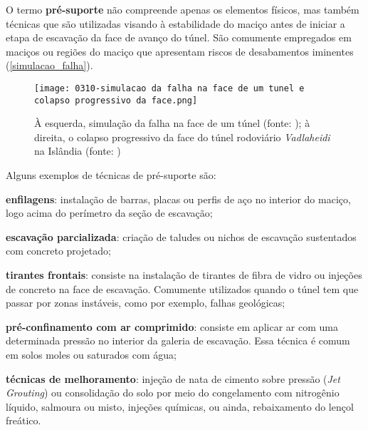 O termo \textbf{pré-suporte} não compreende apenas os elementos físicos, mas também técnicas que são utilizadas visando à estabilidade do maciço antes de iniciar a etapa de escavação da face de avanço do túnel. São comumente empregados em maciços ou regiões do maciço que apresentam riscos de desabamentos iminentes (\autoref{simulacao_falha}).

\begin{figure}[H]
	\begin{center}
		\texttt{[image: 0310-simulacao da falha na face de um tunel e colapso progressivo da face.png]}
	\end{center}
	\caption{\label{simulacao_falha}À esquerda, simulação da falha na face de um túnel (fonte: ); à direita, o colapso progressivo da face do túnel rodoviário \textit{Vadlaheidi} na Islândia (fonte: )}
\end{figure}

Alguns exemplos de técnicas de pré-suporte são:

\begin{alineas}
	
	\item \textbf{enfilagens}: instalação de barras, placas ou perfis de aço no interior do maciço, logo acima do perímetro da seção de escavação;
	
	\item \textbf{escavação parcializada}: criação de taludes ou nichos de escavação sustentados com concreto projetado;
	
	\item \textbf{tirantes frontais}: consiste na instalação de tirantes de fibra de vidro ou injeções de concreto na face de escavação. Comumente utilizados quando o túnel tem que passar por zonas instáveis, como por exemplo, falhas geológicas;
	
	\item \textbf{pré-confinamento com ar comprimido}: consiste em aplicar ar com uma determinada pressão no interior da galeria de escavação. Essa técnica é comum em solos moles ou saturados com água;

	\item \textbf{técnicas de melhoramento}: injeção de nata de cimento sobre pressão (\textit{Jet Grouting}) ou consolidação do solo por meio do congelamento com nitrogênio líquido, salmoura ou misto, injeções químicas, ou ainda, rebaixamento do lençol freático.

\end{alineas}

